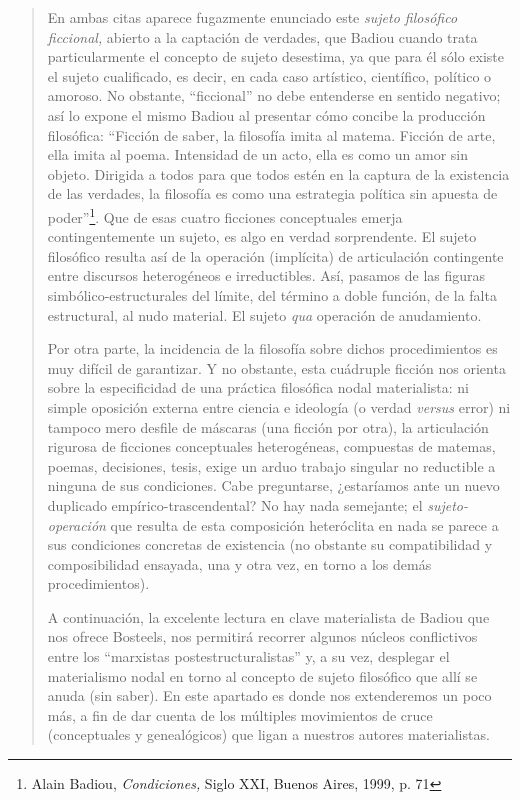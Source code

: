 \begin{quote}
En ambas citas aparece fugazmente enunciado este \emph{sujeto filosófico ficcional,} abierto a la captación de verdades, que Badiou cuando trata particularmente el concepto de sujeto desestima, ya que para él sólo existe el sujeto cualificado, es decir, en cada caso artístico, científico, político o amoroso. No obstante, \enquote{ficcional} no debe entenderse en sentido negativo; así lo expone el mismo Badiou al presentar cómo concibe la producción filosófica: \enquote{Ficción de saber, la filosofía imita al matema. Ficción de arte, ella imita al poema. Intensidad de un acto, ella es como un amor sin objeto. Dirigida a todos para que todos estén en la captura de la existencia de las verdades, la filosofía es como una estrategia política sin apuesta de poder}\footnote{Alain Badiou, \emph{Condiciones,} Siglo XXI, Buenos Aires, 1999, p. 71}. Que de esas cuatro ficciones conceptuales  emerja contingentemente un sujeto, es algo en verdad sorprendente. El sujeto filosófico resulta así de la operación (implícita) de articulación contingente entre discursos heterogéneos e irreductibles. Así, pasamos de las figuras simbólico-estructurales del límite, del término a doble función, de la falta estructural, al nudo material. El sujeto \emph{qua} operación de anudamiento.

Por otra parte, la incidencia de la filosofía sobre dichos procedimientos es muy difícil  de garantizar. Y no obstante, esta cuádruple ficción nos orienta sobre la especificidad de una práctica filosófica nodal materialista: ni simple oposición externa entre ciencia e ideología (o verdad \emph{versus} error) ni tampoco mero desfile de máscaras (una ficción por otra), la articulación rigurosa de ficciones conceptuales heterogéneas, compuestas de matemas, poemas, decisiones, tesis, exige un arduo trabajo singular no reductible a ninguna de sus condiciones. Cabe preguntarse, ¿estaríamos ante un nuevo duplicado empírico-trascendental? No hay nada semejante; el \emph{sujeto-operación} que resulta de esta composición heteróclita en nada se parece a sus condiciones concretas de existencia (no obstante su compatibilidad y composibilidad ensayada, una y otra vez, en torno a los demás procedimientos).

A continuación, la excelente lectura en clave materialista de Badiou que nos ofrece Bosteels, nos permitirá recorrer algunos núcleos conflictivos entre los \enquote{marxistas postestructuralistas} y, a su vez, desplegar el materialismo nodal en torno al concepto de sujeto filosófico que allí se anuda (sin saber). En este apartado es donde nos extenderemos un poco más, a fin de dar cuenta de los múltiples movimientos de cruce (conceptuales y genealógicos) que ligan a nuestros autores materialistas.


\end{quote}
